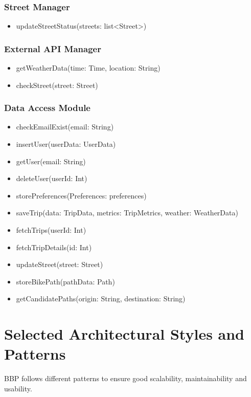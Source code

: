\documentclass{Configuration_Files/PoliMi3i_thesis}
\begin{document}
\subsubsection{Street Manager}
\begin{itemize}
    \item updateStreetStatus(streets: list<Street>)
\end{itemize}

\subsubsection{External API Manager}
\begin{itemize}
    \item getWeatherData(time: Time, location: String)
    \item checkStreet(street: Street)
\end{itemize}

\subsubsection{Data Access Module}
\begin{itemize}
    \item checkEmailExist(email: String)
    \item insertUser(userData: UserData)
    \item getUser(email: String)
    \item deleteUser(userId: Int)
    \item storePreferences(Preferences: preferences)
    \item saveTrip(data: TripData, metrics: TripMetrics, weather: WeatherData)
    \item fetchTrips(userId: Int)
    \item fetchTripDetails(id: Int)
    \item updateStreet(street: Street)
    \item storeBikePath(pathData: Path)
    \item getCandidatePaths(origin: String, destination: String) %
\end{itemize}


\section{Selected Architectural Styles and Patterns}
BBP follows different patterns to ensure good scalability, maintainability and usability.
\end{document}
